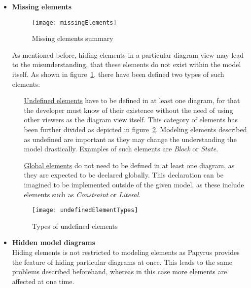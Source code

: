 \begin{itemize}
  \item \textbf{Missing elements}\\
  
\begin{figure}[h!]
\begin{center}
\texttt{[image: missingElements]}\\
\end{center}
\caption{Missing elements summary}
\label{missingElements}
\end{figure}
  		As mentioned before, hiding elements in a particular diagram view may lead
  		to the misunderstanding, that these elements do not exist within the model
  		itself. As shown in figure~\ref{missingElements}, there have been defined
  		two types of such elements:
  		\begin{itemize}
  		  \item[\underline{Undefined elements}] have to be defined in at least one
  		  diagram, for that the developer must know of their existence without the need of using
  		  other viewers as the diagram view itself. This category of elements has
  		  been further divided as depicted in figure~\ref{undefinedElementTypes}.
  		  Modeling elements described as undefined are important as they may change
  		  the understanding the model drastically. Examples of such elements are
  		  \textit{Block} or \textit{State}.
  		  
  		  \item[\underline{Global elements}] do not need to be defined in at least
  		  one diagram, as they are expected to be declared globally. This
  		  declaration can be imagined to be implemented outside of the given model,
  		  as these include elements such as \textit{Constraint} or \textit{Literal}.
  		\end{itemize}
	\begin{figure}[h!]
	\begin{center}
	\texttt{[image: undefinedElementTypes]}\\
	\end{center}
	\caption{Types of undefined elements}
	\label{undefinedElementTypes}
	\end{figure} 
	\newpage
  \item \textbf{Hidden model diagrams}\\
  		Hiding elements is not restricted to modeling elements as Papyrus provides
  		the feature of hiding particular diagrams at once. This leads to the same
  		problems described beforehand, whereas in this case more elements are
  		affected at one time. 
\end{itemize}



